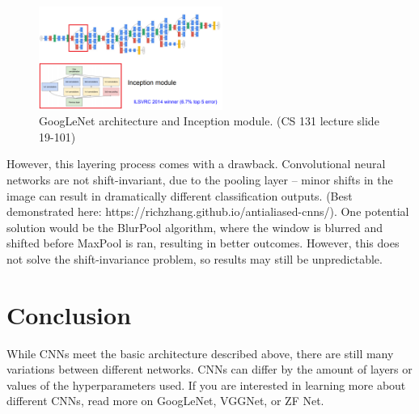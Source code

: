 \documentclass{article}
\begin{document}
\begin{figure}[h]
\includegraphics[width=6cm]{Inception.png}
\centering
\caption{GoogLeNet architecture and Inception module. (CS 131 lecture slide 19-101)}
\end{figure}

However, this layering process comes with a drawback. Convolutional neural networks are not shift-invariant, due to the pooling layer -- minor shifts in the image can result in dramatically different classification outputs. (Best demonstrated here: https://richzhang.github.io/antialiased-cnns/). One potential solution would be the BlurPool algorithm, where the window is blurred and shifted before MaxPool is ran, resulting in better outcomes. However, this does not solve the shift-invariance problem, so results may still be unpredictable.
 
\section{Conclusion}
While CNNs meet the basic architecture described above, there are still many variations between different networks. CNNs can differ by the amount of layers or values of the hyperparameters used. If you are interested in learning more about different CNNs, read more on  GoogLeNet, VGGNet, or ZF Net.

\small


\end{document}
